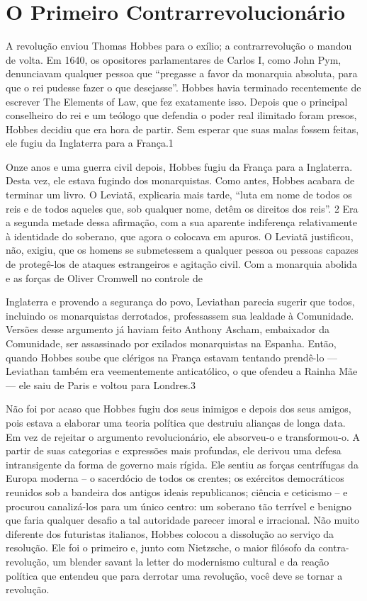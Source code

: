 \chapter{O Primeiro Contrarrevolucionário}\label{O Primeiro Contrarrevolucionário}
 \par 
A revolução enviou Thomas Hobbes para o exílio; a contrarrevolução o mandou de volta. Em 1640, os opositores parlamentares de Carlos I, como John Pym, denunciavam qualquer pessoa que “pregasse a favor da monarquia absoluta, para que o rei pudesse fazer o que desejasse”. Hobbes havia terminado recentemente de escrever The Elements of Law, que fez exatamente isso. Depois que o principal conselheiro do rei e um teólogo que defendia o poder real ilimitado foram presos, Hobbes decidiu que era hora de partir. Sem esperar que suas malas fossem feitas, ele fugiu da Inglaterra para a França.{\color{blue}1}
 \par 
Onze anos e uma guerra civil depois, Hobbes fugiu da França para a Inglaterra. Desta vez, ele estava fugindo dos monarquistas. Como antes, Hobbes acabara de terminar um livro. O Leviatã, explicaria mais tarde, “luta em nome de todos os reis e de todos aqueles que, sob qualquer nome, detêm os direitos dos reis”. {\color{blue}2} Era a segunda metade dessa afirmação, com a sua aparente indiferença relativamente à identidade do soberano, que agora o colocava em apuros. O Leviatã justificou, não, exigiu, que os homens se submetessem a qualquer pessoa ou pessoas capazes de protegê-los de ataques estrangeiros e agitação civil. Com a monarquia abolida e as forças de Oliver Cromwell no controle de
 \par 
Inglaterra e provendo a segurança do povo, Leviathan parecia sugerir que todos, incluindo os monarquistas derrotados, professassem sua lealdade à Comunidade. Versões desse argumento já haviam feito Anthony Ascham, embaixador da Comunidade, ser assassinado por exilados monarquistas na Espanha. Então, quando Hobbes soube que clérigos na França estavam tentando prendê-lo — Leviathan também era veementemente anticatólico, o que ofendeu a Rainha Mãe — ele saiu de Paris e voltou para Londres.{\color{blue}3}
 \par 
Não foi por acaso que Hobbes fugiu dos seus inimigos e depois dos seus amigos, pois estava a elaborar uma teoria política que destruiu alianças de longa data. Em vez de rejeitar o argumento revolucionário, ele absorveu-o e transformou-o. A partir de suas categorias e expressões mais profundas, ele derivou uma defesa intransigente da forma de governo mais rígida. Ele sentiu as forças centrífugas da Europa moderna – o sacerdócio de todos os crentes; os exércitos democráticos reunidos sob a bandeira dos antigos ideais republicanos; ciência e ceticismo – e procurou canalizá-los para um único centro: um soberano tão terrível e benigno que faria qualquer desafio a tal autoridade parecer imoral e irracional. Não muito diferente dos futuristas italianos, Hobbes colocou a dissolução ao serviço da resolução. Ele foi o primeiro e, junto com Nietzsche, o maior filósofo da contra-revolução, um blender savant la letter do modernismo cultural e da reação política que entendeu que para derrotar uma revolução, você deve se tornar a revolução.
